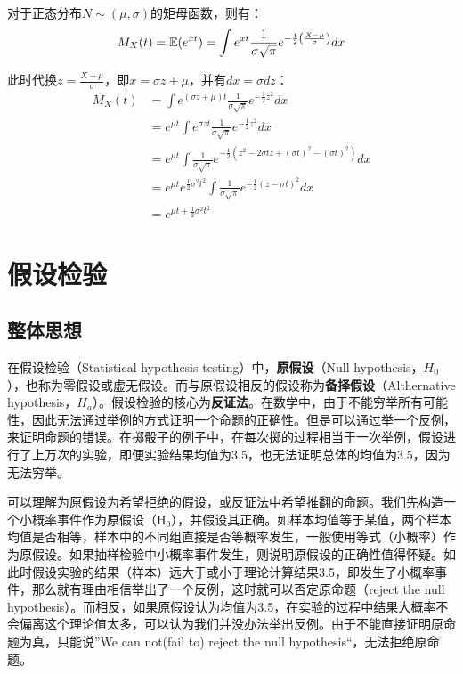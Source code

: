 \documentclass[11pt]{article}
\begin{document}
对于正态分布$N\sim(\mu,\sigma)$的矩母函数，则有：
\begin{equation*}
    M_X(t) = \mathbb{E} (e^{xt}) = \int e^{xt} \frac{1}{\sigma\sqrt{\pi}} e^{-\frac{1}{2} \left( \frac{X-\mu}{\sigma} \right)} dx
\end{equation*}

此时代换$z=\frac{X-\mu}{\sigma}$，即$x= \sigma z + \mu$，并有$dx=\sigma dz$：
\begin{align*}
    M_X(t) &= \int e^{(\sigma z + \mu)t} \frac{1}{\sigma\sqrt{\pi}} e^{-\frac{1}{2}z^2}dx \\
    &= e^{\mu t} \int e^{\sigma z t} \frac{1}{\sigma\sqrt{\pi}} e^{-\frac{1}{2}z^2}dx \\
    &= e^{\mu t} \int \frac{1}{\sigma\sqrt{\pi}} e^{-\frac{1}{2} (z^2 -2\sigma t z + (\sigma t)^2 -(\sigma t)^2)}dx \\
    &= e^{\mu t} e^{\frac{1}{2} \sigma^2 t^2} \int \frac{1}{\sigma\sqrt{\pi}} e^{-\frac{1}{2} (z - \sigma t)^2}dx \\
    &= e^{\mu t + \frac{1}{2} \sigma^2 t^2}
\end{align*}

\section{假设检验}

\subsection{整体思想}

在假设检验（Statistical hypothesis testing）中，\textbf{原假设}（Null hypothesis，$H_0$），也称为零假设或虚无假设。而与原假设相反的假设称为\textbf{备择假设}（Althernative hypothesis，$H_a$）。假设检验的核心为\textbf{反证法}。在数学中，由于不能穷举所有可能性，因此无法通过举例的方式证明一个命题的正确性。但是可以通过举一个反例，来证明命题的错误。在掷骰子的例子中，在每次掷的过程相当于一次举例，假设进行了上万次的实验，即便实验结果均值为3.5，也无法证明总体的均值为3.5，因为无法穷举。

可以理解为原假设为希望拒绝的假设，或反证法中希望推翻的命题。我们先构造一个小概率事件作为原假设（$\text{H}_0$），并假设其正确。如样本均值等于某值，两个样本均值是否相等，样本中的不同组直接是否等概率发生，一般使用等式（小概率）作为原假设。如果抽样检验中小概率事件发生，则说明原假设的正确性值得怀疑。如此时假设实验的结果（样本）远大于或小于理论计算结果3.5，即发生了小概率事件，那么就有理由相信举出了一个反例，这时就可以否定原命题（reject the null hypothesis）。而相反，如果原假设认为均值为3.5，在实验的过程中结果大概率不会偏离这个理论值太多，可以认为我们并没办法举出反例。由于不能直接证明原命题为真，只能说”We can not(fail to) reject the null hypothesis“，无法拒绝原命题。
\end{document}
